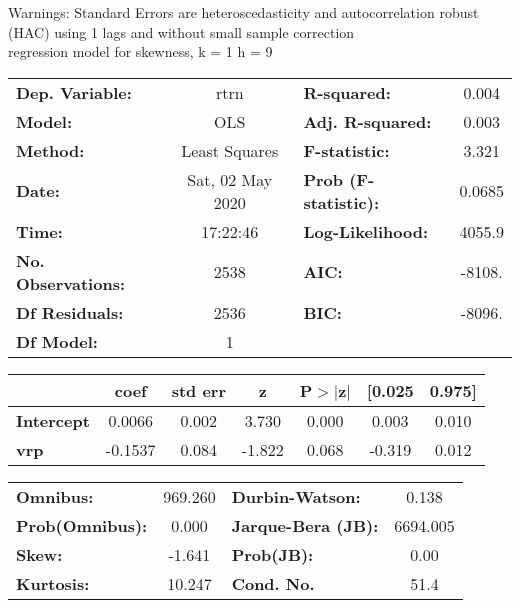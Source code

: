 Warnings: \newline
 [1] Standard Errors are heteroscedasticity and autocorrelation robust (HAC) using 1 lags and without small sample correction\\ 

regression model for skewness, k = 1 h = 9\begin{center}
\begin{tabular}{lclc}
\toprule
\textbf{Dep. Variable:}    &       rtrn       & \textbf{  R-squared:         } &     0.004   \\
\textbf{Model:}            &       OLS        & \textbf{  Adj. R-squared:    } &     0.003   \\
\textbf{Method:}           &  Least Squares   & \textbf{  F-statistic:       } &     3.321   \\
\textbf{Date:}             & Sat, 02 May 2020 & \textbf{  Prob (F-statistic):} &   0.0685    \\
\textbf{Time:}             &     17:22:46     & \textbf{  Log-Likelihood:    } &    4055.9   \\
\textbf{No. Observations:} &        2538      & \textbf{  AIC:               } &    -8108.   \\
\textbf{Df Residuals:}     &        2536      & \textbf{  BIC:               } &    -8096.   \\
\textbf{Df Model:}         &           1      & \textbf{                     } &             \\
\bottomrule
\end{tabular}
\begin{tabular}{lcccccc}
                   & \textbf{coef} & \textbf{std err} & \textbf{z} & \textbf{P$> |$z$|$} & \textbf{[0.025} & \textbf{0.975]}  \\
\midrule
\textbf{Intercept} &       0.0066  &        0.002     &     3.730  &         0.000        &        0.003    &        0.010     \\
\textbf{vrp}       &      -0.1537  &        0.084     &    -1.822  &         0.068        &       -0.319    &        0.012     \\
\bottomrule
\end{tabular}
\begin{tabular}{lclc}
\textbf{Omnibus:}       & 969.260 & \textbf{  Durbin-Watson:     } &    0.138  \\
\textbf{Prob(Omnibus):} &   0.000 & \textbf{  Jarque-Bera (JB):  } & 6694.005  \\
\textbf{Skew:}          &  -1.641 & \textbf{  Prob(JB):          } &     0.00  \\
\textbf{Kurtosis:}      &  10.247 & \textbf{  Cond. No.          } &     51.4  \\
\bottomrule
\end{tabular}
\end{center}

